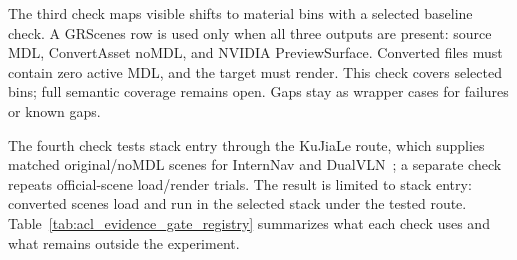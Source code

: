 The third check maps visible shifts to material bins with a selected baseline check. A
GRScenes row is used only when all three outputs are present: source MDL,
\mbox{ConvertAsset} noMDL, and NVIDIA PreviewSurface. Converted files must
contain zero active MDL, and the target must render. This check covers
selected bins; full semantic coverage remains open. Gaps stay as wrapper cases
for failures or known gaps.

The fourth check tests stack entry through the \mbox{KuJiaLe} route, which supplies
matched original/noMDL scenes for InternNav and
\mbox{DualVLN}~\cite{Wei2026Ground}; a separate check repeats official-scene
load/render trials. The result is limited to stack entry: converted scenes load
and run in the selected stack under the tested route.
Table~\ref{tab:acl_evidence_gate_registry} summarizes what each check uses and
what remains outside the experiment.


